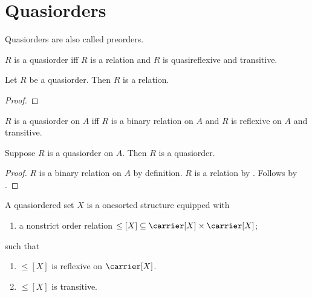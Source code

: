 


\section{Quasiorders}

Quasiorders are also called preorders.

\begin{abbreviation}\label{quasiorder}
    $R$ is a quasiorder iff
    $R$ is a relation and $R$ is quasireflexive and transitive.
\end{abbreviation}

\begin{classification}\label{quasiorder_is_relation}
    Let $R$ be a quasiorder.
    Then $R$ is a relation.
\end{classification}
\begin{proof}
\end{proof}

\begin{abbreviation}\label{quasiorder_on}
    $R$ is a quasiorder on $A$ iff
        $R$ is a binary relation on $A$ and
        $R$ is reflexive on $A$ and transitive.
\end{abbreviation}

\begin{proposition}\label{quasiorder_on_implies_quasiorder}
    Suppose $R$ is a quasiorder on $A$.
    Then $R$ is a quasiorder.
\end{proposition}
\begin{proof}
    $R$ is a binary relation on $A$ by definition.
    $R$ is a relation by
        .
    Follows by
        .
\end{proof}

\begin{struct}\label{quasiordered_set}
    A quasiordered set $X$ is a onesorted structure equipped with
    \begin{enumerate}
        \item\label{quasiorder_relation}
            a nonstrict order relation
            $\leq[X]\subseteq\carrier[X]\times\carrier[X]$;
    \end{enumerate}
    such that
    \begin{enumerate}
        \item\label{quasiorder_refl}
            $\leq[X]$ is reflexive on $\carrier[X]$.
        \item\label{quasiorder_tran}
            $\leq[X]$ is transitive.
    \end{enumerate}
\end{struct}

